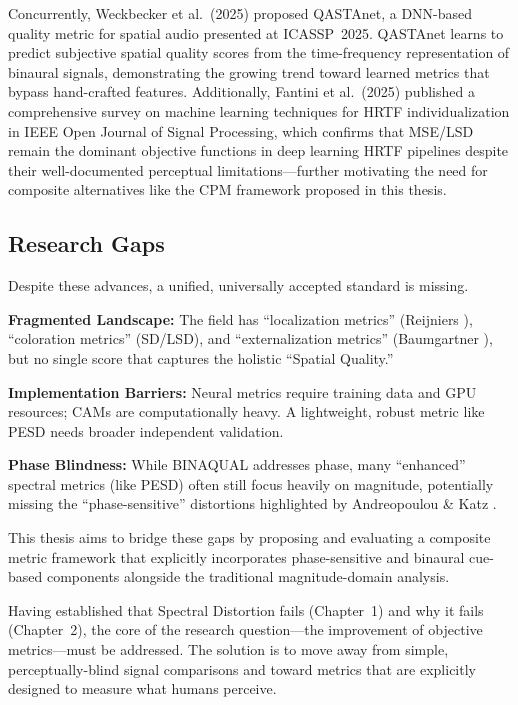 \documentclass[12pt,a4paper]{article}
\begin{document}
Concurrently, Weckbecker et al.\ (2025) \cite{weckbecker2025} proposed QASTAnet, a DNN-based quality metric for spatial audio presented at ICASSP~2025. QASTAnet learns to predict subjective spatial quality scores from the time-frequency representation of binaural signals, demonstrating the growing trend toward learned metrics that bypass hand-crafted features. Additionally, Fantini et al.\ (2025) \cite{fantini2025} published a comprehensive survey on machine learning techniques for HRTF individualization in IEEE Open Journal of Signal Processing, which confirms that MSE/LSD remain the dominant objective functions in deep learning HRTF pipelines despite their well-documented perceptual limitations---further motivating the need for composite alternatives like the CPM framework proposed in this thesis.

\subsection{Research Gaps}

Despite these advances, a unified, universally accepted standard is missing.

\textbf{Fragmented Landscape:} The field has ``localization metrics'' (Reijniers \cite{reijniers2014}), ``coloration metrics'' (SD/LSD), and ``externalization metrics'' (Baumgartner \cite{baumgartner2021}), but no single score that captures the holistic ``Spatial Quality.''

\textbf{Implementation Barriers:} Neural metrics \cite{ananthabhotla2021} require training data and GPU resources; CAMs \cite{engel2022} are computationally heavy. A lightweight, robust metric like PESD needs broader independent validation.

\textbf{Phase Blindness:} While BINAQUAL addresses phase, many ``enhanced'' spectral metrics (like PESD) often still focus heavily on magnitude, potentially missing the ``phase-sensitive'' distortions highlighted by Andreopoulou \& Katz \cite{andreopoulou2022}.

This thesis aims to bridge these gaps by proposing and evaluating a composite metric framework that explicitly incorporates phase-sensitive and binaural cue-based components alongside the traditional magnitude-domain analysis.

Having established that Spectral Distortion fails (Chapter~1) and why it fails (Chapter~2), the core of the research question---the improvement of objective metrics---must be addressed. The solution is to move away from simple, perceptually-blind signal comparisons and toward metrics that are explicitly designed to measure what humans perceive.
\end{document}
